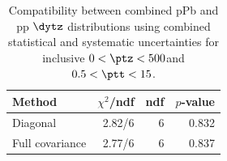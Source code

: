\begin{table}[htp!]
\centering
\begin{tabular}{|l|r|r|r|}
\hline
Method & $\chi^2$/ndf & ndf & $p$-value \\
\hline
Diagonal & 2.82/6 & 6 & 0.832 \\
Full covariance & 2.77/6 & 6 & 0.837 \\
\hline
\end{tabular}
\caption{Compatibility between combined pPb and pp $\dytz$ distributions using combined statistical and systematic uncertainties for inclusive $0 < \ptz < 500$\GeV and $0.5 < \ptt < 15$\GeV.}
\label{table:chisq_deta}
\end{table}
